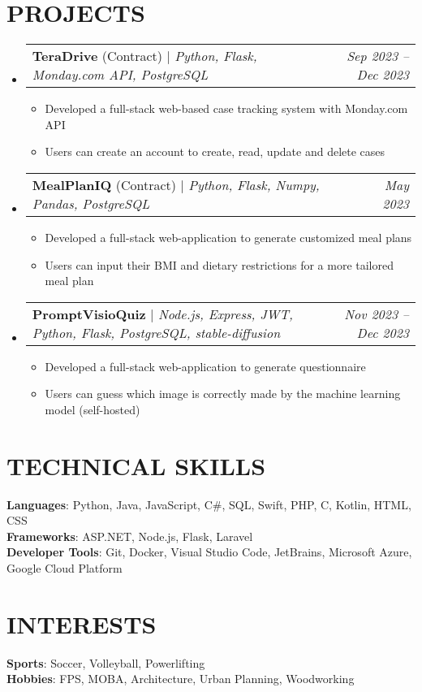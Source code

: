 \documentclass[letterpaper,11pt]{article}
\makeatletter
\newcommand{\resumeItem}[1]{
  \item\small{
    {#1 \vspace{-2pt}}
  }
}
\newcommand{\resumeProjectHeading}[2]{
    \item
    \begin{tabular*}{0.97\textwidth}{l@{\extracolsep{\fill}}r}
      \small#1 & #2 \\
    \end{tabular*}\vspace{-7pt}
}
\newcommand{\resumeSubHeadingListStart}{\begin{itemize}[leftmargin=0.15in, label={}]}
\newcommand{\resumeSubHeadingListEnd}{\end{itemize}}
\newcommand{\resumeItemListStart}{\begin{itemize}}
\newcommand{\resumeItemListEnd}{\end{itemize}\vspace{-5pt}}
\makeatother
\begin{document}
\section{PROJECTS}
    \resumeSubHeadingListStart
      \resumeProjectHeading
          {\textbf{TeraDrive} (Contract) $|$ \emph{Python, Flask, Monday.com API, PostgreSQL}}{\textit{\small{Sep 2023 -- Dec 2023}}}
          \resumeItemListStart
            \resumeItem{Developed a full-stack web-based case tracking system with Monday.com API}
            \resumeItem{Users can create an account to create, read, update and delete cases}
          \resumeItemListEnd
      \resumeProjectHeading
          {\textbf{MealPlanIQ} (Contract) $|$ \emph{Python, Flask, Numpy, Pandas, PostgreSQL}}{\textit{\small{May 2023}}}
          \resumeItemListStart
            \resumeItem{Developed a full-stack web-application to generate customized meal plans}
            \resumeItem{Users can input their BMI and dietary restrictions for a more tailored meal plan}
          \resumeItemListEnd
	  \resumeProjectHeading
		  {\textbf{PromptVisioQuiz} $|$ \emph{Node.js, Express, JWT, Python, Flask, PostgreSQL, stable-diffusion}}{\textit{\small{Nov 2023 -- Dec 2023}}}
		  \resumeItemListStart
		    \resumeItem{Developed a full-stack web-application to generate questionnaire}
			\resumeItem{Users can guess which image is correctly made by the machine learning model (self-hosted)}
		\resumeItemListEnd
    \resumeSubHeadingListEnd

\section{TECHNICAL SKILLS}
 \begin{itemize}[leftmargin=0.15in, label={}]
    \small{\item{
     \textbf{Languages}{: Python, Java, JavaScript, C\#, SQL, Swift, PHP, C, Kotlin, HTML, CSS} \\
     \textbf{Frameworks}{: ASP.NET, Node.js, Flask, Laravel} \\
     \textbf{Developer Tools}{: Git, Docker, Visual Studio Code, JetBrains, Microsoft Azure, Google Cloud Platform} \\
    }}
 \end{itemize}

\section{INTERESTS}
 \begin{itemize}[leftmargin=0.15in, label={}]
    \small{\item{
     \textbf{Sports}{: Soccer, Volleyball, Powerlifting} \\
     \textbf{Hobbies}{: FPS, MOBA, Architecture, Urban Planning, Woodworking} \\
    }}
 \end{itemize}

\end{document}

